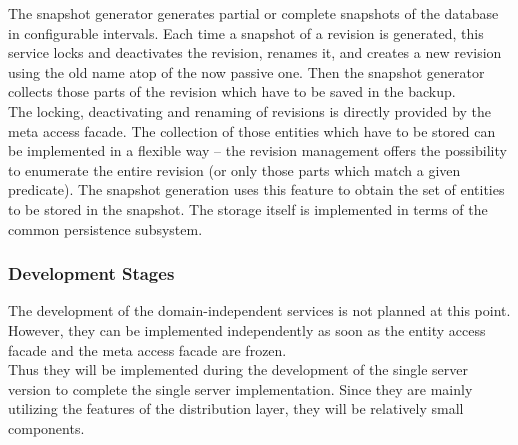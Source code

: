 \documentclass[a4paper, 10pt]{book}
\begin{document}
                                The snapshot generator generates partial or complete snapshots of the
                                database in configurable intervals. Each time a snapshot of a revision
                                is generated, this service locks and deactivates the revision, renames
                                it, and creates a new revision using the old name atop of the now
                                passive one.
                                Then the snapshot generator collects those parts of the revision
                                which have to be saved in the backup.\\
                                The locking, deactivating and renaming of revisions is directly
                                provided by the meta access facade. The collection of those entities
                                which have to be stored can be implemented in a flexible way -- the
                                revision management offers the possibility to enumerate the entire
                                revision (or only those parts which match a given predicate). The
                                snapshot generation uses this feature to obtain the set of entities to
                                be stored in the snapshot. The storage itself is implemented in terms
                                of the common persistence subsystem.


                                \subsubsection{Development Stages}
                                \label{sec:development-stages-5}

                                The development of the domain-independent services is not planned at
                                this point. However, they can be implemented independently as soon as
                                the entity access facade and the meta access facade are frozen.\\
                                Thus they will be implemented during the development of the single
                                server version to complete the single server implementation. Since
                                they are mainly utilizing the features of the distribution layer, they
                                will be relatively small components. 
\end{document}
